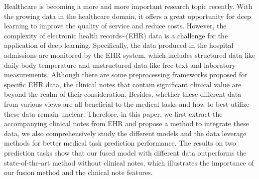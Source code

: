 Healthcare is becoming a more and more important research topic recently. With the growing data in the healthcare domain, it offers a great opportunity for deep learning to improve the quality of service and reduce costs. However, the complexity of electronic health records{\textasciitilde}(EHR) data is a challenge for the application of deep learning. Specifically, the data produced in the hospital admissions are monitored by the EHR system, which includes structured data like daily body temperature and unstructured data like free text and laboratory measurements.  Although there are some preprocessing frameworks proposed for specific EHR data, the clinical notes that contain significant clinical value are beyond the realm of their consideration. Besides, whether these different data from various views are all beneficial to the medical tasks and how to best utilize these data remain unclear. Therefore, in this paper, we first extract the accompanying clinical notes from EHR and propose a method to integrate these data, we also comprehensively study the different models and the data leverage methods for better medical task prediction performance. The results on two prediction tasks show that our fused model with different data outperforms the state-of-the-art method without clinical notes, which illustrates the importance of our fusion method and the clinical note features.
